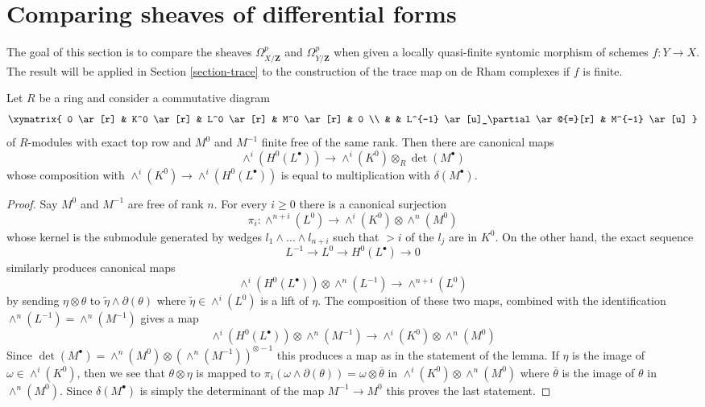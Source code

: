 \section{Comparing sheaves of differential forms}
\label{section-quasi-finite-syntomic}

\noindent
The goal of this section is to compare the sheaves
$\Omega^p_{X/\mathbf{Z}}$ and $\Omega^p_{Y/\mathbf{Z}}$
when given a locally quasi-finite syntomic morphism of schemes $f : Y \to X$.
The result will be applied in Section \ref{section-trace}
to the construction of the trace map on de Rham complexes if $f$ is finite.

\begin{lemma}
\label{lemma-funny-map}
Let $R$ be a ring and consider a commutative diagram
$$
\xymatrix{
0 \ar[r] &
K^0 \ar[r] &
L^0 \ar[r] &
M^0 \ar[r] & 0 \\
& & L^{-1} \ar[u]_\partial \ar@{=}[r] &
M^{-1} \ar[u]
}
$$
of $R$-modules with exact top row and $M^0$ and $M^{-1}$
finite free of the same rank. Then there are canonical maps
$$
\wedge^i(H^0(L^\bullet)) \longrightarrow \wedge^i(K^0) \otimes_R \det(M^\bullet)
$$
whose composition with $\wedge^i(K^0) \to \wedge^i(H^0(L^\bullet))$
is equal to multiplication with $\delta(M^\bullet)$.
\end{lemma}

\begin{proof}
Say $M^0$ and $M^{-1}$ are free of rank $n$. For every $i \geq 0$
there is a canonical surjection
$$
\pi_i :
\wedge^{n + i}(L^0)
\longrightarrow
\wedge^i(K^0) \otimes \wedge^n(M^0)
$$
whose kernel is the submodule generated by wedges
$l_1 \wedge \ldots \wedge l_{n + i}$ such that $> i$ of the
$l_j$ are in $K^0$. On the other hand, the exact sequence
$$
L^{-1} \to L^0 \to H^0(L^\bullet) \to 0
$$
similarly produces canonical maps
$$
\wedge^i(H^0(L^\bullet)) \otimes \wedge^n(L^{-1})
\longrightarrow
\wedge^{n + i}(L^0)
$$
by sending $\eta \otimes \theta$ to $\tilde \eta \wedge \partial(\theta)$
where $\tilde \eta \in \wedge^i(L^0)$ is a lift of $\eta$.
The composition of these two maps, combined with the identification
$\wedge^n(L^{-1}) = \wedge^n(M^{-1})$ gives a map
$$
\wedge^i(H^0(L^\bullet)) \otimes \wedge^n(M^{-1})
\longrightarrow
\wedge^i(K^0) \otimes \wedge^n(M^0)
$$
Since $\det(M^\bullet) = \wedge^n(M^0) \otimes
(\wedge^n(M^{-1}))^{\otimes -1}$ this produces a map as
in the statement of the lemma.
If $\eta$ is the image of $\omega \in \wedge^i(K^0)$, then we see
that $\theta \otimes \eta$ is mapped to
$\pi_i(\omega \wedge \partial(\theta)) = \omega \otimes \overline{\theta}$ in
$\wedge^i(K^0) \otimes \wedge^n(M^0)$ where $\overline{\theta}$
is the image of $\theta$ in $\wedge^n(M^0)$. Since
$\delta(M^\bullet)$ is simply the determinant of the map
$M^{-1} \to M^0$ this proves the last statement.
\end{proof}

